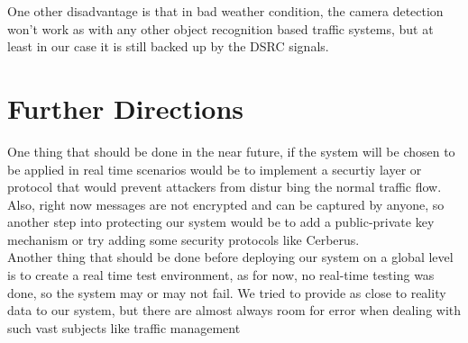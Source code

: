 \documentclass[17pt]{report}
\begin{document}
\indent 
One other disadvantage is that in bad weather condition, the camera 
detection won't work as with any other object recognition based 
traffic systems, but at least in our case it is still backed up by
the DSRC signals.

\chapter{Further Directions}
\indent
One thing that should be done in the near future, if the system will be chosen to be 
applied in real time scenarios would be to implement a securtiy 
layer or protocol that would prevent attackers from distur
bing the 
normal traffic flow. Also, right now messages are not encrypted and 
can be captured by anyone, so another step into protecting our system 
would be to add a public-private key mechanism or try adding some 
security protocols like Cerberus. \\
\indent 
Another thing that should be done before deploying our system on a 
global level is to create a real time test environment, as for now,
no real-time testing was done, so the system may or may not fail. 
We tried to provide as close to reality data to our system, but there 
are almost always room for error when dealing with such vast subjects
like traffic management

\pagebreak
\printbibliography
\end{document}
